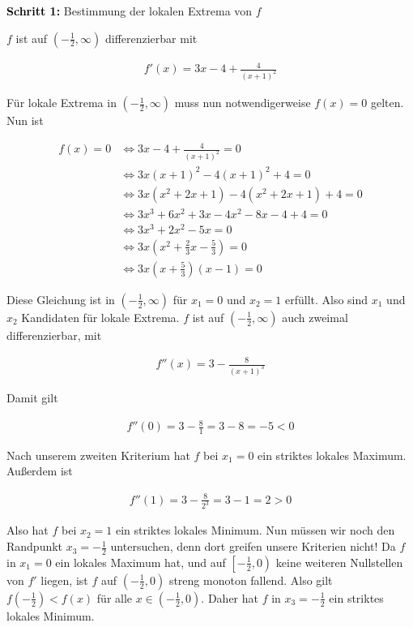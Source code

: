 \documentclass[fontsize=9pt,
               parskip=half-,
               DIV=14,
               listof=chapterentry,
               tocflat]{scrbook}
\newenvironment{indentblock}{\begin{adjustwidth}{.5cm}{}}{\end{adjustwidth}}
\newcommand{\proofstep}[1]{\textbf{\textcolor{Black}{#1}}}
\begin{document}
\begin{solution*}
\proofstep{Schritt 1:}
 Bestimmung der lokalen Extrema von $f$\begin{indentblock}
$f$ ist auf $\left(-{\tfrac {1}{2}},\infty \right)$ differenzierbar mit

\begin{align*}
f'(x)=3x-4+{\tfrac {4}{(x+1)^{2}}}
\end{align*}

Für lokale Extrema in $\left(-{\tfrac {1}{2}},\infty \right)$ muss nun notwendigerweise $f(x)=0$ gelten. Nun ist

\begin{align*}
f(x)=0&\iff 3x-4+{\tfrac {4}{(x+1)^{2}}}=0\\&\iff 3x(x+1)^{2}-4(x+1)^{2}+4=0\\&\iff 3x(x^{2}+2x+1)-4(x^{2}+2x+1)+4=0\\&\iff 3x^{3}+6x^{2}+3x-4x^{2}-8x-4+4=0\\&\iff 3x^{3}+2x^{2}-5x=0\\&\iff 3x\left(x^{2}+{\tfrac {2}{3}}x-{\tfrac {5}{3}}\right)=0\\&\iff 3x\left(x+{\tfrac {5}{3}}\right)(x-1)=0
\end{align*}

Diese Gleichung ist in $\left(-{\tfrac {1}{2}},\infty \right)$ für $x_{1}=0$ und $x_{2}=1$ erfüllt. Also sind $x_{1}$ und $x_{2}$ Kandidaten für lokale Extrema. $f$ ist auf $\left(-{\tfrac {1}{2}},\infty \right)$ auch zweimal differenzierbar, mit

\begin{align*}
f''(x)=3-{\tfrac {8}{(x+1)^{3}}}
\end{align*}

Damit gilt

\begin{align*}
f''(0)=3-{\tfrac {8}{1}}=3-8=-5<0
\end{align*}

Nach unserem zweiten Kriterium hat $f$ bei $x_{1}=0$ ein striktes lokales Maximum. Außerdem ist

\begin{align*}
f''(1)=3-{\tfrac {8}{2^{3}}}=3-1=2>0
\end{align*}

Also hat $f$ bei $x_{2}=1$ ein striktes lokales Minimum. Nun müssen wir noch den Randpunkt $x_{3}=-{\tfrac {1}{2}}$ untersuchen, denn dort greifen unsere Kriterien nicht! Da $f$ in $x_{1}=0$ ein lokales Maximum hat, und auf $\left[-{\tfrac {1}{2}},0\right)$ keine weiteren Nullstellen von $f'$ liegen, ist $f$ auf $\left(-{\tfrac {1}{2}},0\right)$ streng monoton fallend. Also gilt $f\left(-{\tfrac {1}{2}}\right)<f(x)$ für alle $x\in \left(-{\tfrac {1}{2}},0\right)$. Daher hat $f$ in $x_{3}=-{\tfrac {1}{2}}$ ein striktes lokales Minimum.


\end{indentblock}
\end{solution*}
\end{document}
